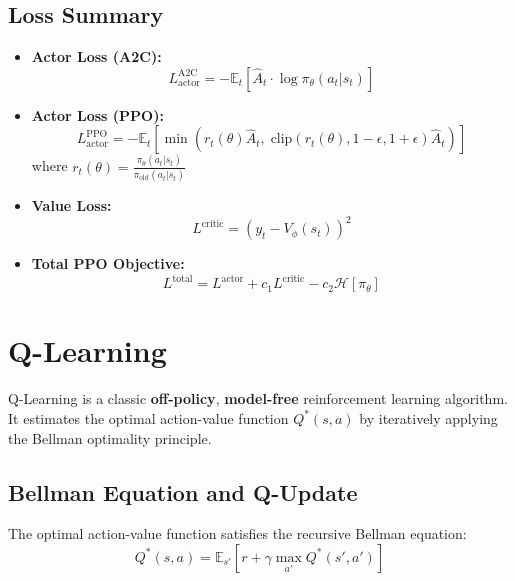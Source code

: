 \documentclass{article}
\begin{document}
\subsection{Loss Summary}

\begin{itemize}
    \item \textbf{Actor Loss (A2C):}
    \begin{equation}
        L^{\text{A2C}}_{\text{actor}} = - \mathbb{E}_t \left[ \hat{A}_t \cdot \log \pi_\theta(a_t | s_t) \right]
    \end{equation}
    
    \item \textbf{Actor Loss (PPO):}
    \begin{equation}
        L^{\text{PPO}}_{\text{actor}} = - \mathbb{E}_t \left[ \min \left( r_t(\theta) \hat{A}_t,\; \text{clip}(r_t(\theta), 1 - \epsilon, 1 + \epsilon)\hat{A}_t \right) \right]
    \end{equation}
    where $r_t(\theta) = \frac{\pi_\theta(a_t|s_t)}{\pi_{\text{old}}(a_t|s_t)}$

    \item \textbf{Value Loss:}
    \begin{equation}
        L^{\text{critic}} = \left( y_t - V_\phi(s_t) \right)^2
    \end{equation}
    
    \item \textbf{Total PPO Objective:}
    \begin{equation}
        L^{\text{total}} = L^{\text{actor}} + c_1 L^{\text{critic}} - c_2 \mathcal{H}[\pi_\theta]
    \end{equation}
\end{itemize}


\section{Q-Learning}

Q-Learning is a classic \textbf{off-policy}, \textbf{model-free} reinforcement learning algorithm. It estimates the optimal action-value function $Q^*(s,a)$ by iteratively applying the Bellman optimality principle.

\subsection{Bellman Equation and Q-Update}

The optimal action-value function satisfies the recursive Bellman equation:
\begin{equation}
    Q^*(s,a) = \mathbb{E}_{s'}\left[ r + \gamma \max_{a'} Q^*(s', a') \right]
\end{equation}
\end{document}
